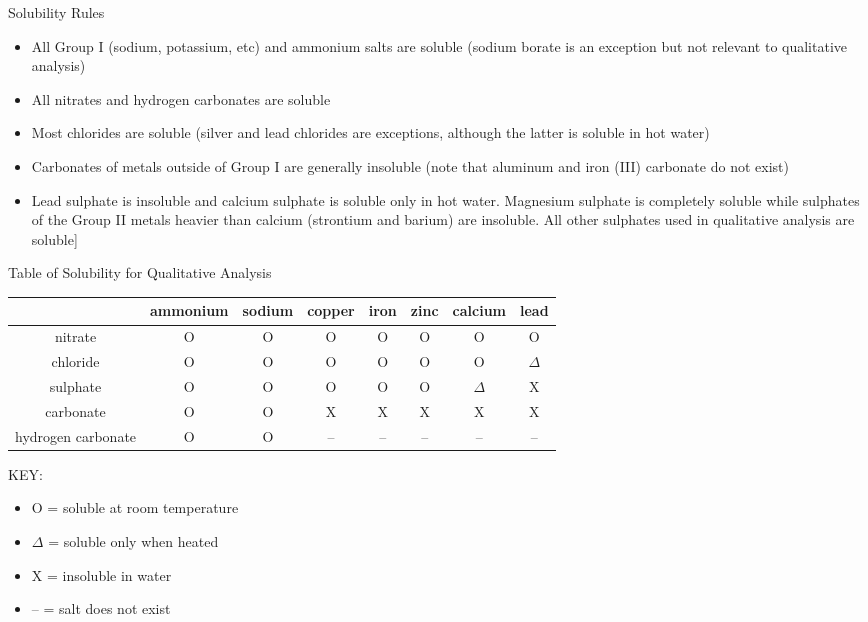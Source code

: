 Solubility Rules
\begin{itemize}
\item{All Group I (sodium, potassium, etc) and ammonium salts are soluble (sodium borate is an exception but not relevant to qualitative analysis)}
\item{All nitrates and hydrogen carbonates are soluble}
\item{Most chlorides are soluble (silver and lead chlorides are exceptions, 
although the latter is soluble in hot water)}
\item{Carbonates of metals outside of Group I are generally insoluble (note that aluminum and iron (III) carbonate do not exist)}
\item{Lead sulphate is insoluble and calcium sulphate is soluble only in hot water. Magnesium sulphate is completely soluble while sulphates of the Group II metals heavier than calcium 
(strontium and barium) are insoluble. All other sulphates used in qualitative analysis are soluble}]
\end{itemize}

Table of Solubility for Qualitative Analysis
\begin{center}
\begin{tabular}{ | c | c | c | c | c | c | c | c | } \hline
& ammonium & sodium & copper & iron & zinc & calcium & lead \\ \hline
nitrate & O & O & O & O & O & O & O \\ \hline
chloride & O & O & O & O & O & O & $\Delta$ \\ \hline
sulphate & O & O & O & O & O & $\Delta$ & X \\ \hline
carbonate & O & O & X & X & X & X & X \\ \hline
hydrogen carbonate & O & O & -- & -- & -- & -- & -- \\ \hline
\end{tabular}
\end{center}

KEY:
\begin{itemize}
\item{O = soluble at room temperature}
\item{$\Delta$ = soluble only when heated}
\item{X = insoluble in water}
\item{-- = salt does not exist}
\end{itemize}

